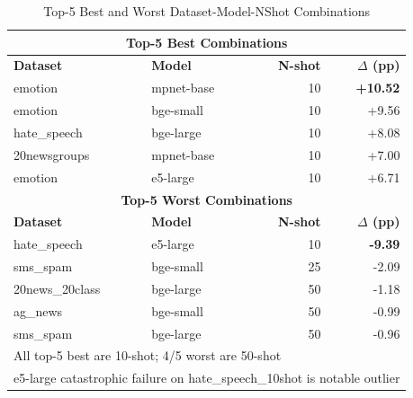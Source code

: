 
\begin{table}[htbp]
\centering
\caption{Top-5 Best and Worst Dataset-Model-NShot Combinations}
\label{tab:embedding_extremes}
\begin{tabular}{llrr}
\toprule
\multicolumn{4}{c}{\textbf{Top-5 Best Combinations}} \\
\midrule
\textbf{Dataset} & \textbf{Model} & \textbf{N-shot} & \textbf{$\Delta$ (pp)} \\
\midrule
emotion          & mpnet-base     & 10 & \textbf{+10.52} \\
emotion          & bge-small      & 10 & +9.56 \\
hate\_speech     & bge-large      & 10 & +8.08 \\
20newsgroups     & mpnet-base     & 10 & +7.00 \\
emotion          & e5-large       & 10 & +6.71 \\
\midrule
\multicolumn{4}{c}{\textbf{Top-5 Worst Combinations}} \\
\midrule
\textbf{Dataset} & \textbf{Model} & \textbf{N-shot} & \textbf{$\Delta$ (pp)} \\
\midrule
hate\_speech     & e5-large       & 10 & \textbf{-9.39} \\
sms\_spam        & bge-small      & 25 & -2.09 \\
20news\_20class  & bge-large      & 50 & -1.18 \\
ag\_news         & bge-small      & 50 & -0.99 \\
sms\_spam        & bge-large      & 50 & -0.96 \\
\midrule
\multicolumn{4}{l}{\small All top-5 best are 10-shot; 4/5 worst are 50-shot} \\
\multicolumn{4}{l}{\small e5-large catastrophic failure on hate\_speech\_10shot is notable outlier} \\
\bottomrule
\end{tabular}
\end{table}


